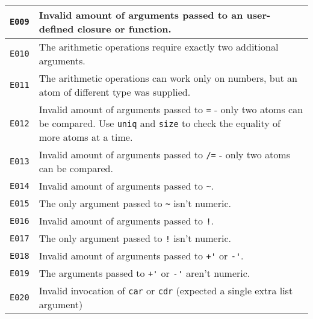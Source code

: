 \begin{longtable}{ | p{6em} | p{34em} | }
\verb|E009|          & Invalid amount of arguments passed to an user-defined closure or function.                                                                     \\ \hline
\verb|E010|          & The arithmetic operations require exactly two additional arguments.                                                                            \\ \hline
\verb|E011|          & The arithmetic operations can work only on numbers, but an atom of different type was supplied.                                                \\ \hline
\verb|E012|          & Invalid amount of arguments passed to \verb|=| - only two atoms can be compared. Use \verb|uniq| and \verb|size| to check the equality of more atoms at a time. \\ \hline
\verb|E013|          & Invalid amount of arguments passed to \verb|/=| - only two atoms can be compared.                                                              \\ \hline
\verb|E014|          & Invalid amount of arguments passed to \verb|~|.                                                                                                \\ \hline
\verb|E015|          & The only argument passed to \verb|~| isn't numeric.                                                                                            \\ \hline
\verb|E016|          & Invalid amount of arguments passed to \verb|!|.                                                                                                \\ \hline
\verb|E017|          & The only argument passed to \verb|!| isn't numeric.                                                                                            \\ \hline
\verb|E018|          & Invalid amount of arguments passed to \verb|+'| or \verb|-'|.                                                                                  \\ \hline
\verb|E019|          & The arguments passed to \verb|+'| or \verb|-'| aren't numeric.                                                                                 \\ \hline
\verb|E020|          & Invalid invocation of \verb|car| or \verb|cdr| (expected a single extra list argument)                                                         \\ \hline

\end{longtable}
